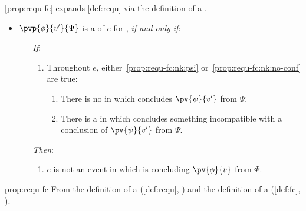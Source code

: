 \begin{note}
  \autoref{prop:requ-fc} expands \autoref{def:requ} via the definition of a \fc{}.

  \begin{proposition}
    \label{prop:requ-fc}

    \begin{itemize}
    \item
      \(\pvp{\phi}{v'}{\Psi}\) is a \emph{\requ{}} of \(e\) for \vAgent{}, \emph{if and only if}:
      \begin{itemize}
      \item[\emph{If}:]
        \begin{enumerate}[label=\alph*., ref=(\alph*), series=requDefSeries]
        \item
          \label{prop:requ-fc:nk}
          Throughout \(e\), either~\ref{prop:requ-fc:nk:psi} or~\ref{prop:requ-fc:nk:no-conf} are true:
          \begin{enumerate}[label=\roman*., ref=(\roman*)]
          \item
            \label{prop:requ-fc:nk:psi}
            There is no \pevent{} in which \vAgent{} concludes \(\pv{\psi}{v'}\) from \(\Psi\).
          \item
            \label{prop:requ-fc:nk:no-conf}
            There is a \pevent{} in which \vAgent{} concludes something incompatible with a conclusion of \(\pv{\psi}{v'}\) from \(\Psi\).
          \end{enumerate}
        \end{enumerate}
      \item[\emph{Then}:]
        \begin{enumerate}[label=\alph*., ref=(\alph*), resume*=requDefSeries]
        \item
          \label{prop:requ-fc:ne}
          \(e\) is not an event in which \vAgent{} is concluding \(\pv{\phi}{v}\) from \(\Phi\).
        \end{enumerate}
      \end{itemize}
    \end{itemize}
    \vspace{-\baselineskip}
  \end{proposition}

  \begin{argument}{prop:requ-fc}
    From the definition of a \requ{} (\autoref{def:requ}, ) and the definition of a \fc{} (\autoref{def:fc}, ).
  \end{argument}
\end{note}

